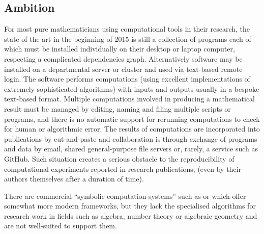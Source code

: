 \subsection{Ambition}





For most pure mathematicians using computational tools in their
research, the state of the art in the beginning of 2015 is still a collection of
programs each of which must be installed individually on their
desktop or laptop computer, respecting a complicated dependencies graph.
Alternatively software may be installed on a
departmental server or cluster and used via text-based remote
login. The software performs computations (using excellent
implementations of extremely sophisticated algorithms) with inputs and
outputs usually in a bespoke text-based format. 
Multiple computations involved in producing a mathematical
result must be managed by editing, naming and filing multiple scripts
or programs, and there is no automatic support for rerunning
computations to check for human or algorithmic error. The results of
computations are incorporated into publications by cut-and-paste and
collaboration is through exchange of programs and data by email,
shared general-purpose file servers or, rarely, a service such as
GitHub. Such situation creates a serious obstacle to the reproducibility
of computational experiments reported in research publications,
(even by their authors themselves after a duration of time). 

There are commercial ``symbolic computation systems'' such as
\Mathematica or \Maple which offer somewhat more modern frameworks, but
they lack the specialised algorithms for research work in fields such
as algebra, number theory or algebraic geometry and are not
well-suited to support them. 


